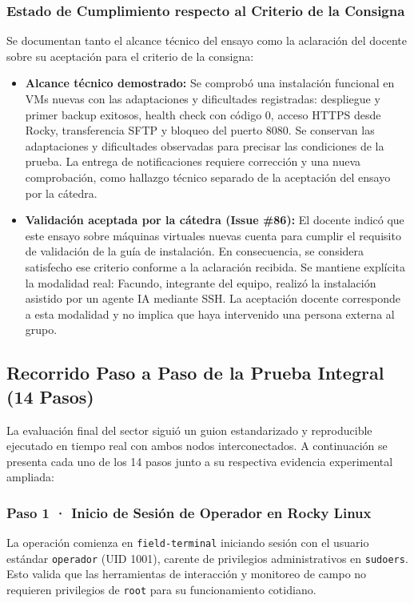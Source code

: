\documentclass[10pt,a4paper]{article}
\begin{document}
\subsubsection*{Estado de Cumplimiento respecto al Criterio de la Consigna}

Se documentan tanto el alcance técnico del ensayo como la aclaración del docente sobre su aceptación para el criterio de la consigna:
\begin{itemize}[leftmargin=*]
    \item \textbf{Alcance técnico demostrado:} Se comprobó una instalación funcional en VMs nuevas con las adaptaciones y dificultades registradas: despliegue y primer backup exitosos, health check con código 0, acceso HTTPS desde Rocky, transferencia SFTP y bloqueo del puerto 8080. Se conservan las adaptaciones y dificultades observadas para precisar las condiciones de la prueba. La entrega de notificaciones requiere corrección y una nueva comprobación, como hallazgo técnico separado de la aceptación del ensayo por la cátedra.
    \item \textbf{Validación aceptada por la cátedra (Issue \#86):} El docente indicó que este ensayo sobre máquinas virtuales nuevas cuenta para cumplir el requisito de validación de la guía de instalación. En consecuencia, se considera satisfecho ese criterio conforme a la aclaración recibida. Se mantiene explícita la modalidad real: Facundo, integrante del equipo, realizó la instalación asistido por un agente IA mediante SSH. La aceptación docente corresponde a esta modalidad y no implica que haya intervenido una persona externa al grupo.
\end{itemize}

\subsection{Recorrido Paso a Paso de la Prueba Integral (14 Pasos)}
\label{sec:integral}

La evaluación final del sector siguió un guion estandarizado y reproducible ejecutado en tiempo real con ambos nodos interconectados. A continuación se presenta cada uno de los 14 pasos junto a su respectiva evidencia experimental ampliada:

\subsubsection*{Paso 1 · Inicio de Sesión de Operador en Rocky Linux}
La operación comienza en \texttt{field-terminal} iniciando sesión con el usuario estándar \texttt{operador} (UID 1001), carente de privilegios administrativos en \texttt{sudoers}. Esto valida que las herramientas de interacción y monitoreo de campo no requieren privilegios de \texttt{root} para su funcionamiento cotidiano.
\end{document}
